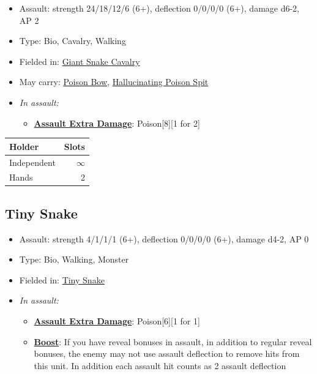 \documentclass[a4paper,12pt]{article}
\begin{document}
\begin{itemize}
\item Assault: strength 24/18/12/6 (6+), deflection 0/0/0/0 (6+), damage d6-2, AP 2
\item Type: Bio, Cavalry, Walking
\item Fielded in: \hyperref[unit-giant-snake-cavalry]{Giant Snake Cavalry}
\item May carry: \hyperref[equipment-poison-bow-free]{Poison Bow}, \hyperref[equipment-hallucinating-poison-spit]{Hallucinating Poison Spit}



\item \textit{In assault:}
\begin{itemize}
\item \textbf{\hyperref[rule-special-assault-extra-damage]{Assault Extra Damage}}: Poison[8][1 for 2]

\end{itemize}

\end{itemize}

\begin{tabular}{lr}
\textbf{Holder} & \textbf{Slots} \\
\hline
Independent & $\infty$ \\
Hands & 2 \\
\end{tabular}
\vspace{1ex}
\subsection{Tiny Snake}
\label{model-tiny-snake}

\begin{itemize}
\item Assault: strength 4/1/1/1 (6+), deflection 0/0/0/0 (6+), damage d4-2, AP 0
\item Type: Bio, Walking, Monster
\item Fielded in: \hyperref[unit-tiny-snake]{Tiny Snake}



\item \textit{In assault:}
\begin{itemize}
\item \textbf{\hyperref[rule-special-assault-extra-damage]{Assault Extra Damage}}: Poison[6][1 for 1]
\item \textbf{\hyperref[rule-special-boost]{Boost}}: If you have reveal bonuses in assault, in addition to regular reveal bonuses, the enemy may not use assault deflection to remove hits from this unit. In addition each assault hit counts as 2 assault deflection

\end{itemize}

\end{itemize}
\end{document}
